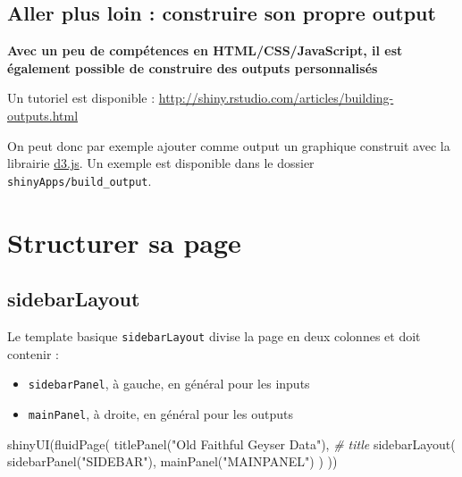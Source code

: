 \documentclass[
]{article}
\newenvironment{Shaded}{\begin{snugshade}}{\end{snugshade}}
\newcommand{\CommentTok}[1]{\textcolor[rgb]{0.56,0.35,0.01}{\textit{#1}}}
\newcommand{\FunctionTok}[1]{\textcolor[rgb]{0.00,0.00,0.00}{#1}}
\newcommand{\NormalTok}[1]{#1}
\newcommand{\StringTok}[1]{\textcolor[rgb]{0.31,0.60,0.02}{#1}}
\begin{document}
\hypertarget{aller-plus-loin-construire-son-propre-output}{%
\subsection{Aller plus loin : construire son propre
output}\label{aller-plus-loin-construire-son-propre-output}}

\textbf{Avec un peu de compétences en HTML/CSS/JavaScript, il est
également possible de construire des outputs personnalisés}

Un tutoriel est disponible :
\url{http://shiny.rstudio.com/articles/building-outputs.html}

On peut donc par exemple ajouter comme output un graphique construit
avec la librairie \href{https://d3js.org/}{d3.js}. Un exemple est
disponible dans le dossier \texttt{shinyApps/build\_output}.

\hypertarget{structurer-sa-page}{%
\section{Structurer sa page}\label{structurer-sa-page}}

\hypertarget{sidebarlayout}{%
\subsection{sidebarLayout}\label{sidebarlayout}}

Le template basique \texttt{sidebarLayout} divise la page en deux
colonnes et doit contenir :

\begin{itemize}
\item
  \texttt{sidebarPanel}, à gauche, en général pour les inputs
\item
  \texttt{mainPanel}, à droite, en général pour les outputs
\end{itemize}

\begin{Shaded}
\begin{Highlighting}[]
\FunctionTok{shinyUI}\NormalTok{(}\FunctionTok{fluidPage}\NormalTok{(}
  \FunctionTok{titlePanel}\NormalTok{(}\StringTok{"Old Faithful Geyser Data"}\NormalTok{), }\CommentTok{\# title}
  \FunctionTok{sidebarLayout}\NormalTok{(}
    \FunctionTok{sidebarPanel}\NormalTok{(}\StringTok{"SIDEBAR"}\NormalTok{),}
    \FunctionTok{mainPanel}\NormalTok{(}\StringTok{"MAINPANEL"}\NormalTok{)}
\NormalTok{  )}
\NormalTok{))}
\end{Highlighting}
\end{Shaded}
\end{document}
